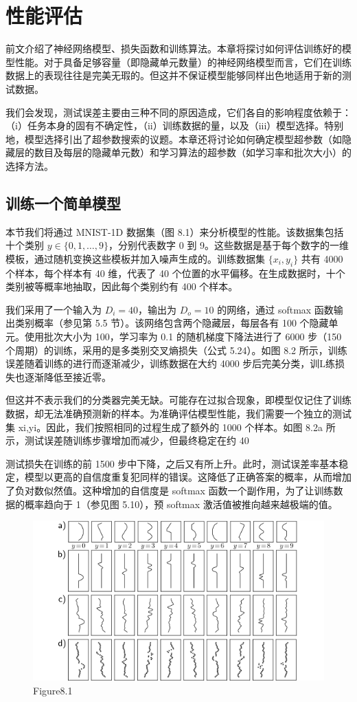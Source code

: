 \chapter{性能评估}

前文介绍了神经网络模型、损失函数和训练算法。本章将探讨如何评估训练好的模型性能。对于具备足够容量（即隐藏单元数量）的神经网络模型而言，它们在训练数据上的表现往往是完美无瑕的。但这并不保证模型能够同样出色地适用于新的测试数据。

我们会发现，测试误差主要由三种不同的原因造成，它们各自的影响程度依赖于：（i）任务本身的固有不确定性，（ii）训练数据的量，以及（iii）模型选择。特别地，模型选择引出了超参数搜索的议题。本章还将讨论如何确定模型超参数（如隐藏层的数目及每层的隐藏单元数）和学习算法的超参数（如学习率和批次大小）的选择方法。
\section{训练一个简单模型}
本节我们将通过 MNIST-1D 数据集（图 8.1）来分析模型的性能。该数据集包括十个类别 \(y \in \{0,1,\ldots,9\}\)，分别代表数字 0 到 9。这些数据是基于每个数字的一维模板，通过随机变换这些模板并加入噪声生成的。训练数据集 \(\{x_i, y_i\}\) 共有 4000 个样本，每个样本有 40 维，代表了 40 个位置的水平偏移。在生成数据时，十个类别被等概率地抽取，因此每个类别约有 400 个样本。

我们采用了一个输入为 \(D_i = 40\)，输出为 \(D_o = 10\) 的网络，通过 softmax 函数输出类别概率（参见第 5.5 节）。该网络包含两个隐藏层，每层各有 100 个隐藏单元。使用批次大小为 100，学习率为 0.1 的随机梯度下降法进行了 6000 步（150 个周期）的训练，采用的是多类别交叉熵损失（公式 5.24）。如图 8.2 所示，训练误差随着训练的进行而逐渐减少，训练数据在大约 4000 步后完美分类，训L练损失也逐渐降低至接近零。

但这并不表示我们的分类器完美无缺。可能存在过拟合现象，即模型仅记住了训练数据，却无法准确预测新的样本。为准确评估模型性能，我们需要一个独立的测试集 {xi,yi}。因此，我们按照相同的过程生成了额外的 1000 个样本。如图 8.2a 所示，测试误差随训练步骤增加而减少，但最终稳定在约 40%

测试损失在训练的前 1500 步中下降，之后又有所上升。此时，测试误差率基本稳定，模型以更高的自信度重复犯同样的错误。这降低了正确答案的概率，从而增加了负对数似然值。这种增加的自信度是 softmax 函数一个副作用，为了让训练数据的概率趋向于 1（参见图 5.10），预 softmax 激活值被推向越来越极端的值。

\begin{figure}[h!]
\centering
\includegraphics[width=0.7\linewidth]{png/chapter8/PerfMNIST1D.png}
\caption{Figure8.1}
\end{figure}

